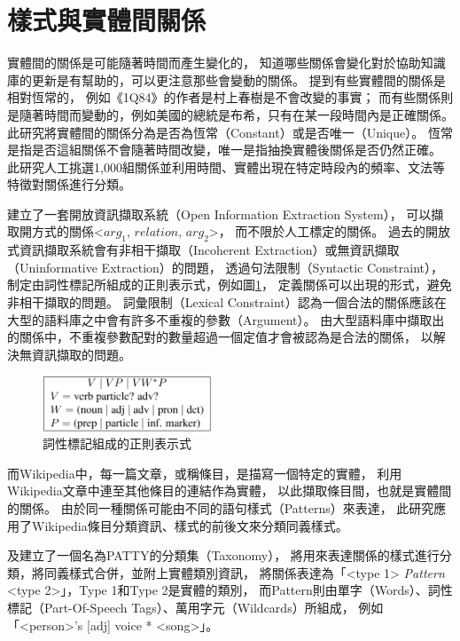 
%
%
\section{樣式與實體間關係}

實體間的關係是可能隨著時間而產生變化的，
知道哪些關係會變化對於協助知識庫的更新是有幫助的，可以更注意那些會變動的關係。
\cite{relationsByTime} 提到有些實體間的關係是相對恆常的，
例如《1Q84》的作者是村上春樹是不會改變的事實；
而有些關係則是隨著時間而變動的，例如美國的總統是布希，只有在某一段時間內是正確關係。
此研究將實體間的關係分為是否為恆常（Constant）或是否唯一（Unique）。
恆常是指是否這組關係不會隨著時間改變，唯一是指抽換實體後關係是否仍然正確。
此研究人工挑選1,000組關係並利用時間、實體出現在特定時段內的頻率、文法等特徵對關係進行分類。

\cite{reverb} 建立了一套開放資訊擷取系統（Open Information Extraction System），
可以擷取開方式的關係<$arg_1$, $relation$, $arg_2$>，
而不限於人工標定的關係。
過去的開放式資訊擷取系統會有非相干擷取（Incoherent Extraction）或無資訊擷取（Uninformative Extraction）的問題，
透過句法限制（Syntactic Constraint），
制定由詞性標記所組成的正則表示式，例如圖\ref{i:reverb-pos}，
定義關係可以出現的形式，避免非相干擷取的問題。
詞彙限制（Lexical Constraint）認為一個合法的關係應該在大型的語料庫之中會有許多不重複的參數（Argument）。
由大型語料庫中擷取出的關係中，不重複參數配對的數量超過一個定值才會被認為是合法的關係，
以解決無資訊擷取的問題。

\begin{figure}
    \centering
    \includegraphics[width=0.45\textwidth]{images/02-reverb-pos}
    \caption{詞性標記組成的正則表示式}
    \label{i:reverb-pos}
\end{figure}

而Wikipedia中，每一篇文章，或稱條目，是描寫一個特定的實體，
\cite{wisenet} 利用Wikipedia文章中連至其他條目的連結作為實體，
以此擷取條目間，也就是實體間的關係。
由於同一種關係可能由不同的語句樣式（Patterns）來表達，
此研究應用了Wikipedia條目分類資訊、樣式的前後文來分類同義樣式。

\cite{patty2012}及\cite{patty}建立了一個名為PATTY的分類集（Taxonomy），
將用來表達關係的樣式進行分類，將同義樣式合併，並附上實體類別資訊，
將關係表達為「<type 1> \emph{Pattern} <type 2>」，Type 1和Type 2是實體的類別，
而Pattern則由單字（Words）、詞性標記（Part-Of-Speech Tags）、萬用字元（Wildcards）所組成，
例如「<person>'s [adj] voice * <song>」。   %

